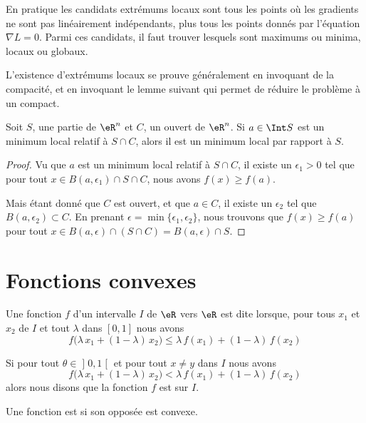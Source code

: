 En pratique les candidats extrémums locaux sont tous les points où les gradients ne sont pas linéairement indépendants, plus tous les points donnés par l'équation \( \nabla L=0\). Parmi ces candidats, il faut trouver lesquels sont maximums ou minima, locaux ou globaux.

L'existence d'extrémums locaux se prouve généralement en invoquant de la compacité, et en invoquant le lemme suivant qui permet de réduire le problème à un compact.

\begin{lemma}       \label{LemmeMinSCimpliqueS}
	Soit \( S\), une partie de \( \eR^n\) et \( C\), un ouvert de \( \eR^n\). Si \( a\in\Int S\) est un minimum local relatif à \( S\cap C\), alors il est un minimum local par rapport à \( S\).
\end{lemma}

\begin{proof}
	Vu que \( a\) est un minimum local relatif à \( S\cap C\), il existe un \( \epsilon_1> 0\) tel que pour tout \( x\in B(a,\epsilon_1)\cap S\cap C\), nous avons \( f(x)\geq f(a)\).

	Mais étant donné que \( C\) est ouvert, et que \( a\in C\), il existe un \( \epsilon_2\) tel que \( B(a,\epsilon_2)\subset C\). En prenant \( \epsilon=\min\{ \epsilon_1,\epsilon_2 \}\), nous trouvons que \( f(x)\geq f(a)\) pour tout \( x\in B(a,\epsilon)\cap(S\cap C)=B(a,\epsilon)\cap S\).
\end{proof}

\section{Fonctions convexes}
\label{SECooVZWWooUjxXYi}

\begin{definition}  \label{DefVQXRJQz}
	Une fonction \( f\) d’un intervalle \( I\) de \( \eR\) vers \( \eR\) est dite  lorsque, pour tous \( x_1\) et \( x_2\) de \( I\) et tout \( \lambda\) dans \( [0, 1]\) nous avons
	\begin{equation}        \label{EQooYNAPooFePQZy}
		f\big(\lambda\, x_1+(1-\lambda)\, x_2\big) \leq \lambda\, f(x_1)+(1-\lambda)\, f(x_2)
	\end{equation}

	Si pour tout \( \theta\in \mathopen] 0 , 1 \mathclose[\) et pour tout \( x\neq y\) dans \( I\) nous avons
	\begin{equation}
		f\big(\lambda\, x_1+(1-\lambda)\, x_2\big) < \lambda\, f(x_1)+(1-\lambda)\, f(x_2)
	\end{equation}
	alors nous disons que la fonction \( f\) est  sur \( I\).

	Une fonction est  si son opposée est convexe.
\end{definition}

